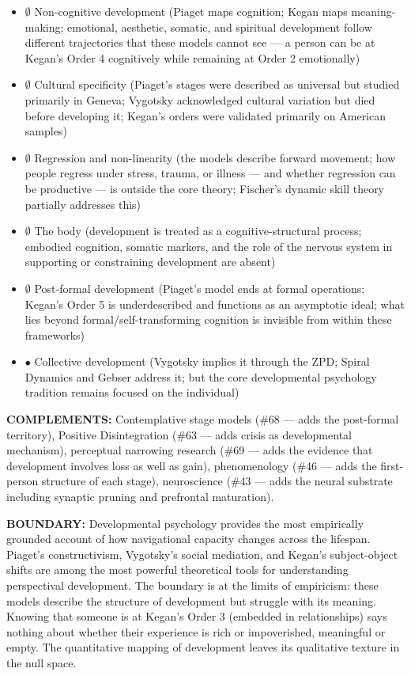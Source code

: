 \begin{itemize}[nosep,leftmargin=*]
  \item $\emptyset$ Non-cognitive development (Piaget maps cognition; Kegan maps meaning-making; emotional, aesthetic, somatic, and spiritual development follow different trajectories that these models cannot see — a person can be at Kegan's Order 4 cognitively while remaining at Order 2 emotionally)
  \item $\emptyset$ Cultural specificity (Piaget's stages were described as universal but studied primarily in Geneva; Vygotsky acknowledged cultural variation but died before developing it; Kegan's orders were validated primarily on American samples)
  \item $\emptyset$ Regression and non-linearity (the models describe forward movement; how people regress under stress, trauma, or illness — and whether regression can be productive — is outside the core theory; Fischer's dynamic skill theory partially addresses this)
  \item $\emptyset$ The body (development is treated as a cognitive-structural process; embodied cognition, somatic markers, and the role of the nervous system in supporting or constraining development are absent)
  \item $\emptyset$ Post-formal development (Piaget's model ends at formal operations; Kegan's Order 5 is underdescribed and functions as an asymptotic ideal; what lies beyond formal/\allowbreak self-transforming cognition is invisible from within these frameworks)
  \item $\bullet$ Collective development (Vygotsky implies it through the ZPD; Spiral Dynamics and Gebser address it; but the core developmental psychology tradition remains focused on the individual)
\end{itemize}


\textbf{COMPLEMENTS:} Contemplative stage models (\#68 — adds the post-formal territory), Positive Disintegration (\#63 — adds crisis as developmental mechanism), perceptual narrowing research (\#69 — adds the evidence that development involves loss as well as gain), phenomenology (\#46 — adds the first-person structure of each stage), neuroscience (\#43 — adds the neural substrate including synaptic pruning and prefrontal maturation).


\textbf{BOUNDARY:} Developmental psychology provides the most empirically grounded account of how navigational capacity changes across the lifespan. Piaget's constructivism, Vygotsky's social mediation, and Kegan's subject-object shifts are among the most powerful theoretical tools for understanding perspectival development. The boundary is at the limits of empiricism: these models describe the structure of development but struggle with its meaning. Knowing that someone is at Kegan's Order 3 (embedded in relationships) says nothing about whether their experience is rich or impoverished, meaningful or empty. The quantitative mapping of development leaves its qualitative texture in the null space.


